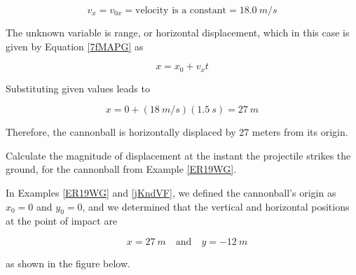 \documentclass[main-physics.tex]{subfiles}
\begin{document}
\begin{equation*}
    v_x = v_{0x} = \text{velocity is a constant} = \SI{18.0}{m/s}
\end{equation*}

The unknown variable is range, or horizontal displacement, which in this case is given by Equation \eqref{7fMAPG} as

\begin{equation*}
    x = x_0 + v_x t
\end{equation*}

Substituting given values leads to 

\begin{equation*}
    x = 0 + (\SI{18}{m/s})(\SI{1.5}{s}) = \SI{27}{m}
\end{equation*}

Therefore, the cannonball is horizontally displaced by 27 meters from its origin.

\endsolution

\begin{example}
    Calculate the magnitude of displacement at the instant the projectile strikes the ground, for the cannonball from Example \ref{ER19WG}.
\end{example}

\Solution In Examples \ref{ER19WG} and \ref{jKndVF}, we defined the cannonball's origin as $x_0 = 0$ and $y_0 = 0$, and we determined that the vertical and horizontal positions at the point of impact are

\begin{equation*}
    \quad x = \SI{27}{m} \quad \text{and} \quad y = \SI{-12}{m}
\end{equation*}

as shown in the figure below.

\begin{center}
\end{center}
\end{document}
